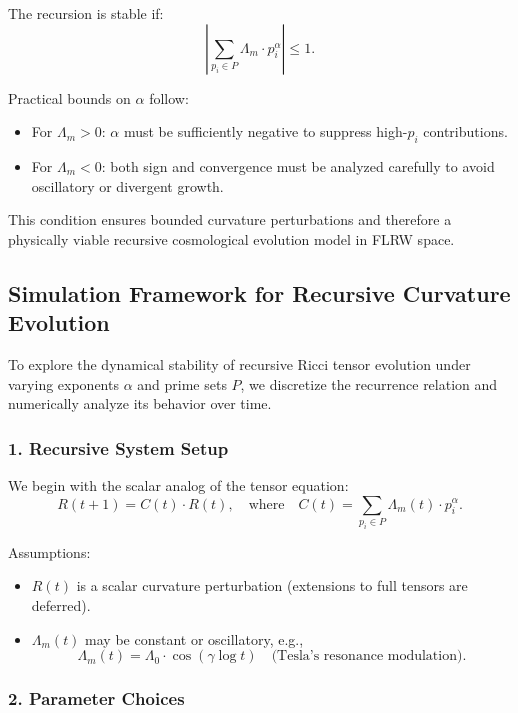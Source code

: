 \documentclass[12pt]{article}
\theoremstyle{plain}
\begin{document}
The recursion is stable if:
\begin{equation}
\left| \sum_{p_i \in P} \Lambda_m \cdot p_i^\alpha \right| \leq 1.
\end{equation}

Practical bounds on $\alpha$ follow:
\begin{itemize}
    \item For $\Lambda_m > 0$: $\alpha$ must be sufficiently negative to suppress high-$p_i$ contributions.
    \item For $\Lambda_m < 0$: both sign and convergence must be analyzed carefully to avoid oscillatory or divergent growth.
\end{itemize}

This condition ensures bounded curvature perturbations and therefore a physically viable recursive cosmological evolution model in FLRW space.
\subsection{Simulation Framework for Recursive Curvature Evolution}

To explore the dynamical stability of recursive Ricci tensor evolution under varying exponents $\alpha$ and prime sets $P$, we discretize the recurrence relation and numerically analyze its behavior over time.

\subsubsection*{1. Recursive System Setup}

We begin with the scalar analog of the tensor equation:
\begin{equation}
R(t+1) = C(t) \cdot R(t), \quad \text{where} \quad C(t) = \sum_{p_i \in P} \Lambda_m(t) \cdot p_i^\alpha.
\end{equation}

Assumptions:
\begin{itemize}
    \item $R(t)$ is a scalar curvature perturbation (extensions to full tensors are deferred).
    \item $\Lambda_m(t)$ may be constant or oscillatory, e.g.,
    \[
    \Lambda_m(t) = \Lambda_0 \cdot \cos(\gamma \log t) \quad \text{(Tesla’s resonance modulation)}.
    \]
\end{itemize}

\subsubsection*{2. Parameter Choices}
\end{document}
